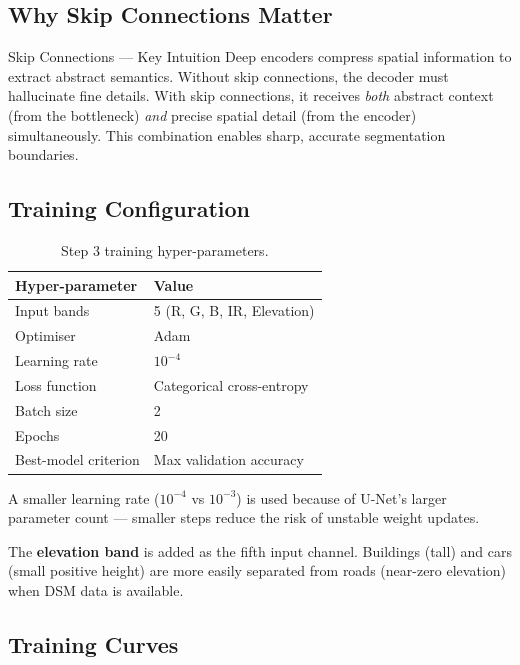 \documentclass[12pt,a4paper]{article}
\begin{document}
\subsection{Why Skip Connections Matter}

\begin{infobox}{Skip Connections — Key Intuition}
Deep encoders compress spatial information to extract abstract semantics.
Without skip connections, the decoder must hallucinate fine details.
With skip connections, it receives \emph{both} abstract context (from the
bottleneck) \emph{and} precise spatial detail (from the encoder) simultaneously.
This combination enables sharp, accurate segmentation boundaries.
\end{infobox}

\subsection{Training Configuration}

\begin{table}[h!]
  \centering
  \caption{Step 3 training hyper-parameters.}
  \begin{tabular}{ll}
    \toprule
    \textbf{Hyper-parameter} & \textbf{Value} \\
    \midrule
    Input bands     & 5 (R, G, B, IR, Elevation) \\
    Optimiser       & Adam \\
    Learning rate   & $10^{-4}$ \\
    Loss function   & Categorical cross-entropy \\
    Batch size      & 2 \\
    Epochs          & 20 \\
    Best-model criterion & Max validation accuracy \\
    \bottomrule
  \end{tabular}
\end{table}

A smaller learning rate ($10^{-4}$ vs $10^{-3}$) is used because of U-Net's
larger parameter count — smaller steps reduce the risk of unstable weight updates.

The \textbf{elevation band} is added as the fifth input channel.
Buildings (tall) and cars (small positive height) are more easily separated
from roads (near-zero elevation) when DSM data is available.

\subsection{Training Curves}
\end{document}
